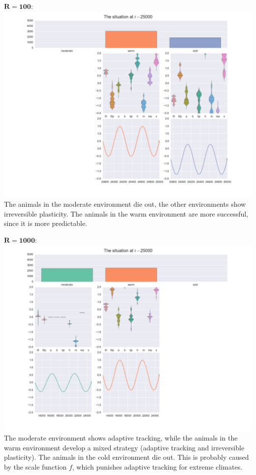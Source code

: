 \documentclass[
12pt, %
a4paper, %
headinclude,footinclude %
]{article}
\begin{document}
\begin{description}
\item{$\mathbf{R=100}$:} \\
\includegraphics[width=\linewidth]{R100/end.png}
The animals in the moderate environment die out, the other environments show irreversible plasticity. The animals in the warm environment are more successful, since it is more predictable.

\item{$\mathbf{R=1000}$:} \\
\includegraphics[width=\linewidth]{R1000/end.png}
The moderate environment shows adaptive tracking, while the animals in the warm environment develop a mixed strategy (adaptive tracking and irreversible plasticity). The animals in the cold environment die out. This is probably caused by the scale function $f$, which punishes adaptive tracking for extreme climates.
\end{description}
\end{document}
